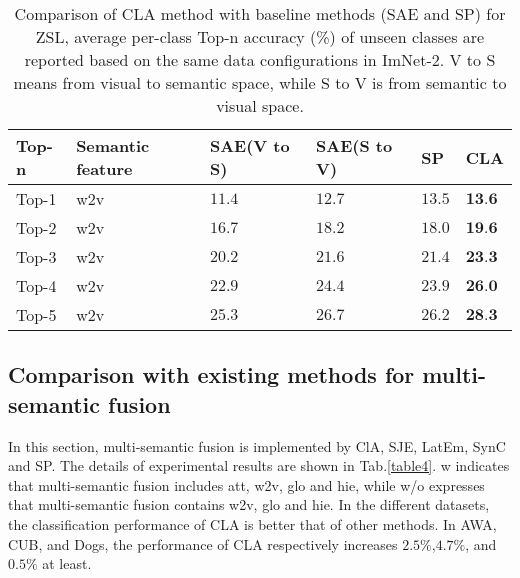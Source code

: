 \documentclass[review]{elsarticle}
\begin{document}
\begin{table}[!ht]
\small
\renewcommand{\arraystretch}{1.0}
\caption{Comparison of CLA method with baseline methods (SAE and SP) for ZSL, average per-class Top-n accuracy (\%) of unseen classes are reported based on the same data configurations in ImNet-2. V to S means from visual to semantic space, while S to V is from semantic to visual space.}
\label{table3}
\begin{center}
\newcommand{\tabincell}[2]{\begin{tabular}{@{}#1@{}}#2\end{tabular}}
\begin{tabular}{lp{2.3cm}p{1.8cm}p{1.8cm}p{1cm}p{1cm}}
\hline
\bfseries Top-n &\bfseries Semantic feature &\bfseries SAE(V to S) &\bfseries SAE(S to V) &\bfseries SP &\bfseries CLA\\
\hline \hline
Top-1  & w2v &$11.4$ & $12.7$ & $13.5$ & $\textbf{13.6}$\\
\hline
Top-2  & w2v &$16.7$ & $18.2$ & $18.0$ & $\textbf{19.6}$\\
\hline
Top-3 & w2v &$20.2$ & $21.6$ & $21.4$ & $\textbf{23.3}$\\
\hline
Top-4  & w2v &$22.9$ & $24.4$ & $23.9$ & $\textbf{26.0}$\\
\hline
Top-5   & w2v &$25.3$ & $26.7$ & $26.2$ & $\textbf{28.3}$\\
\hline
\end{tabular}
\end{center}
\end{table}

\subsection{Comparison with existing methods for multi-semantic fusion }
In this section, multi-semantic fusion is implemented by ClA, SJE\cite{7298911}, LatEm\cite{7780384}, SynC \cite{Changpinyo2016} and SP\cite{Lin2018structure}. The details of experimental results are shown in Tab.\ref{table4}. w indicates that multi-semantic fusion includes att, w2v, glo and hie, while w/o expresses that multi-semantic fusion contains w2v, glo and hie. In the different datasets, the classification performance of CLA is better that of other methods. In AWA, CUB, and Dogs, the performance of CLA respectively increases $2.5\%$,$4.7\%$, and $0.5\%$ at least.
\end{document}
